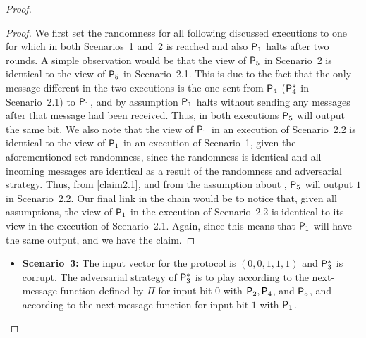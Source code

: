 \begin{proof}
	\begin{proof}
	We first set the randomness for all following discussed executions to one for which in both Scenarios~1 and~2 \agr is reached and also $\mathsf{P}_1$ halts after two rounds. A simple observation would be that the view of $\mathsf{P}_5$ in Scenario~2 is identical to the view of $\mathsf{P}_5$ in Scenario~2.1. This is due to the fact that the only message different in the two executions is the one sent from $\mathsf{P}_4$ ($\mathsf{P}_4^\ast$ in Scenario~2.1) to $\mathsf{P}_1$, and by assumption $\mathsf{P}_1$ halts without sending any messages after that message had been received. Thus, in both executions $\mathsf{P}_5$ will output the same bit. We also note that the view of $\mathsf{P}_1$ in an execution of Scenario~2.2 is identical to the view of $\mathsf{P}_1$ in an execution of Scenario~1, given the aforementioned set randomness, since the randomness is identical and all incoming messages are identical as a result of the randomness and adversarial strategy. Thus, from \cref{claim2.1}, and from the assumption about \agr {}, $\mathsf{P}_5$ will output $1$ in Scenario~2.2. Our final link in the chain would be to notice that, given all assumptions, the view of $\mathsf{P}_1$ in the execution of Scenario~2.2 is identical to its view in the execution of Scenario~2.1. Again, since this means that $\mathsf{P}_1$ will have the same output, and we have the claim.
	\end{proof}

\begin{itemize}
    \item\textbf{Scenario~3:}
	The input vector for the protocol is $(0,0,1,1,1)$ and $\mathsf{P}_3^\ast$ is corrupt. The adversarial strategy of  $\mathsf{P}_3^\ast$ is to play according to the next-message function defined by $\Pi$ for input bit $0$ with $\mathsf{P}_2, \mathsf{P}_4$, and $\mathsf{P}_5$, and according to the next-message function for input bit $1$ with $\mathsf{P}_1$.
\end{itemize}	
	

\end{proof}

